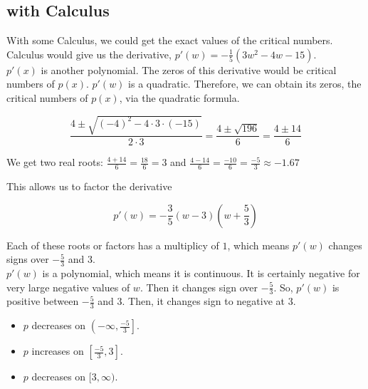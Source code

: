 \documentclass{ximera}
\begin{document}
\subsection*{with Calculus}


With some Calculus, we could get the exact values of the critical numbers. \\



Calculus would give us the derivative, $p'(w) = -\frac{1}{5}(3w^2 - 4w - 15)$. \\

$p'(x)$ is another polynomial. The zeros of this derivative would be critical numbers of $p(x)$.  $p'(w)$ is a quadratic.  Therefore, we can obtain its zeros, the critical numbers of $p(x)$, via the quadratic formula.


\[  \frac{4 \pm \sqrt{(-4)^2 - 4 \cdot 3 \cdot (-15)}}{2 \cdot 3} =    \frac{4 \pm \sqrt{196}}{6}  = \frac{4 \pm 14}{6}       \]

We get two real roots: $\frac{4 + 14}{6} = \frac{18}{6} = 3$  and $\frac{4 - 14}{6} = \frac{-10}{6} = \frac{-5}{3} \approx -1.67$




This allows us to factor the derivative

\[
p'(w) = -\frac{3}{5}(w - 3) \left( w + \frac{5}{3} \right)
\]

Each of these roots or factors has a multiplicy of $1$, which means $p'(w)$ changes signs over $-\frac{5}{3}$ and $3$. \\


$p'(w)$ is a polynomial, which means it is continuous. It is certainly negative for very large negative values of $w$.  Then it changes sign over $-\frac{5}{3}$.  So, $p'(w)$ is positive between $-\frac{5}{3}$ and $3$.  Then, it changes sign to negative at $3$.





\begin{itemize}
\item $p$ decreases on $\left(-\infty, \frac{-5}{3}\right]$.
\item $p$ increases on $\left[\frac{-5}{3}, 3\right]$.
\item $p$ decreases on $[3, \infty)$.
\end{itemize}
\end{document}

